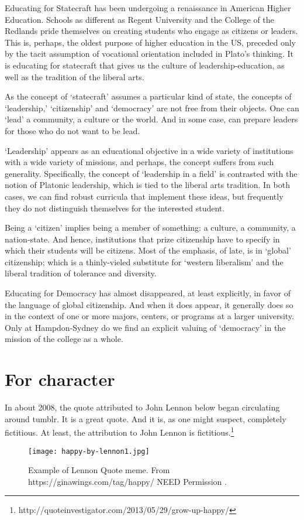 Educating for Statecraft has been undergoing a renaissance in American Higher Education. Schools as different as Regent University and the College of the Redlands pride themselves on creating students who engage as citizens or leaders. This is, perhaps, the oldest purpose of higher education in the US, preceded only by the tacit assumption of vocational orientation included in Plato's thinking. It is educating for statecraft that gives us the culture of leadership-education, as well as the tradition of the liberal arts.

As the concept of `statecraft' assumes a particular kind of state, the concepts of `leadership,' `citizenship' and `democracy' are not free from their objects. One can `lead' a community, a culture or the world. And in some case, can prepare leaders for those who do not want to be lead. 

`Leadership' appears as an educational objective in a wide variety of institutions with a wide variety of missions, and perhaps, the concept suffers from such generality. Specifically, the concept of `leadership in a field' is contrasted with the notion of Platonic leadership, which is tied to the liberal arts tradition. In both cases, we can find robust curricula that implement these ideas, but frequently they do not distinguish themselves for the interested student.

Being a `citizen' implies being a member of something: a culture, a community, a nation-state. And hence, institutions that prize citizenship have to specify in which their students will be citizens. Most of the emphasis, of late, is in `global' citizenship; which is a thinly-vieled substitute for `western liberalism' and the liberal tradition of tolerance and diversity.

Educating for Democracy has almost disappeared, at least explicitly, in favor of the language of global citizenship. And when it does appear, it generally does so in the context of one or more majors, centers, or programs at a larger university. Only at Hampdon-Sydney do we find an explicit valuing of `democracy' in the mission of the college as a whole. 

\chapter{For character}
\label{forcharacter}

In about 2008, the quote attributed to John Lennon below began circulating around tumblr. It is a great quote. And it is, as one might suspect, completely fictitious. At least, the attribution to John Lennon is fictitious.\footnote{http:\slash \slash quoteinvestigator.com\slash 2013\slash 05\slash 29\slash grow-up-happy\slash }\begin{figure*}\texttt{[image: happy-by-lennon1.jpg]}\caption{Example of Lennon Quote meme.  From https://ginawings.com/tag/happy/ NEED Permission .}\label{fig:lennon}\end{figure*}

